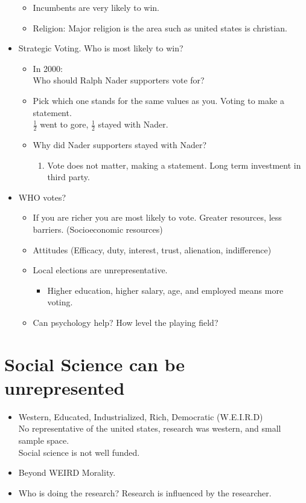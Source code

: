 \documentclass{article}
\begin{document}
\begin{itemize}
\begin{itemize}
        \item Incumbents are very likely to win. 
        \item Religion: Major religion is the area such as united states is christian. 
    \end{itemize}
    \item Strategic Voting. Who is most likely to win? 
    \begin{itemize}
        \item In 2000: \\
        Who should Ralph Nader supporters vote for? 
        \item Pick which one stands for the same values as you. Voting to make a statement. \\
        $\frac{1}{2}$ went to gore, $\frac{1}{2}$ stayed with Nader. 
        \item Why did Nader supporters stayed with Nader? 
        \begin{enumerate}
            \item Vote does not matter, making a statement. Long term investment in third party. 
        \end{enumerate}
    \end{itemize}
    \item WHO votes?
    \begin{itemize}
        \item If you are richer you are most likely to vote. Greater resources, less barriers. (Socioeconomic resources)
        \item Attitudes (Efficacy, duty, interest, trust, alienation, indifference) 
        \item Local elections are unrepresentative. 
        \begin{itemize}
            \item Higher education, higher salary, age, and employed means more voting. 
        \end{itemize}
        \item Can psychology help? How level the playing field? 
    \end{itemize}
\end{itemize}
\section*{Social Science can be unrepresented}
\begin{itemize}
    \item Western, Educated, Industrialized, Rich, Democratic (W.E.I.R.D)\\
    No representative of the united states, research was western, and small sample space.\\
    Social science is not well funded. \\
    \item Beyond WEIRD Morality. 
    \item Who is doing the research? Research is influenced by the researcher. 
\end{itemize}
\end{document}
